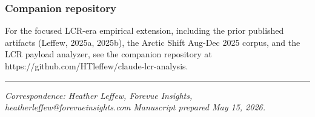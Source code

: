 \documentclass[11pt]{article}
\begin{document}
\subsubsection{Companion repository}

For the focused LCR-era empirical extension, including the prior published artifacts (Leffew, 2025a, 2025b), the Arctic Shift Aug-Dec 2025 corpus, and the LCR payload analyzer, see the companion repository at https://github.com/HTleffew/claude-lcr-analysis.

\bigskip\hrule\bigskip

\emph{Correspondence: Heather Leffew, Forevue Insights, heatherleffew@forevueinsights.com} \emph{Manuscript prepared May 15, 2026.}
\end{document}
